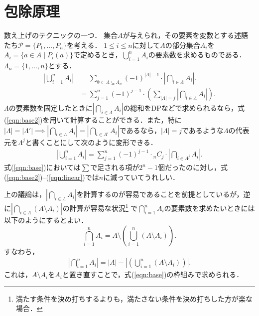 \documentclass{jsarticle}
\begin{document}
\section{包除原理}

数え上げのテクニックの一つ．
集合$A$が与えられ，その要素を変数とする述語たち$\mathcal{P}=\{P_1, \dots, P_n\}$を考える．
$1\le i\le n$に対して$A$の部分集合$A_i$を$A_i=\{a\in A\mid P_i(a)\}$で定めるとき，$\bigcup_{i=1}^n A_i$の要素数を求めるものである．
$\Lambda_n=\{1, \dots, n\}$とする．
\begin{align}\label{eqn:base}
\left|\bigcup_{i=1}^n A_i\right|
&= \sum_{\emptyset\subset\Lambda\subseteq \Lambda_n} (-1)^{|\Lambda|-1}\cdot \left|\bigcap_{i\in\Lambda} A_i\right|.\\
\label{eqn:base2}
&= \sum_{j=1}^n (-1)^{j-1}\cdot \left(\sum_{|\Lambda|=j} \left|\bigcap_{i\in\Lambda} A_i\right|\right).
\end{align}
$\Lambda$の要素数を固定したときに$\left|\bigcap_{i\in\Lambda} A_i\right|$の総和をDPなどで求められるなら，式(\ref{eqn:base2})を用いて計算することができる．また，特に
$|\Lambda|=|\Lambda'|\implies\left|\bigcap_{i\in\Lambda}A_i\right| = \left|\bigcap_{i\in\Lambda'}A_i\right|$であるなら，$|\Lambda|=j$であるような$\Lambda$の代表元を$\Lambda^j$と書くことにして次のように変形できる．
\begin{align}\label{eqn:linear}
  \left|\bigcup_{i=1}^n A_i\right|
  = \sum_{j=1}^n (-1)^{j-1}\cdot {}_n C_j\cdot\left|\bigcap_{i\in\Lambda^j}A_i\right|.
\end{align}
式(\ref{eqn:base})においては$\sum$で足される項が$2^n-1$個だったのに対し，式(\ref{eqn:base2})--(\ref{eqn:linear})では$n$に減っていてうれしい．

上の議論は，$\left|\bigcap_{i\in\Lambda}A_i\right|$を計算するのが容易であることを前提としているが，逆に$\left|\bigcap_{i\in\Lambda}(A\setminus A_i)\right|$の計算が容易な状況\footnote{満たす条件を決め打ちするよりも，満たさない条件を決め打ちした方が楽な場合．}
で$\bigcap_{i=1}^n A_i$の要素数を求めたいときには以下のようにするとよい．
\[
\bigcap_{i=1}^n A_i = A\setminus\left(\bigcup_{i=1}^n (A\setminus A_i)\right).
\]
すなわち，
\begin{align}\label{eqn:cmpl}
\left|\bigcap_{i=1}^n A_i\right| = |A|-\left|\left(\bigcup_{i=1}^n (A\setminus A_i)\right)\right|.
\end{align}
これは，$A\setminus A_i$を$A_i$と置き直すことで，式(\ref{eqn:base})の枠組みで求められる．
\end{document}
